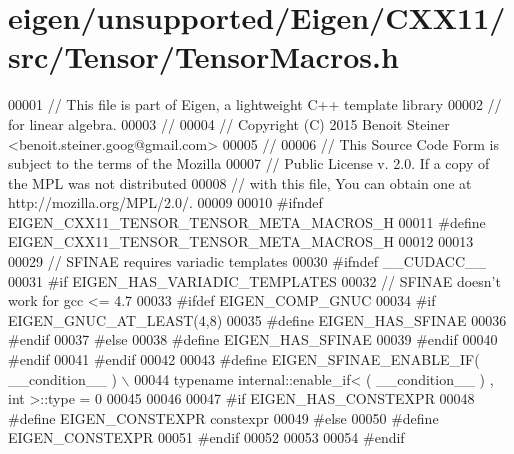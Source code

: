 \hypertarget{eigen_2unsupported_2_eigen_2_c_x_x11_2src_2_tensor_2_tensor_macros_8h_source}{}\section{eigen/unsupported/\+Eigen/\+C\+X\+X11/src/\+Tensor/\+Tensor\+Macros.h}
\label{eigen_2unsupported_2_eigen_2_c_x_x11_2src_2_tensor_2_tensor_macros_8h_source}

\begin{DoxyCode}
00001 \textcolor{comment}{// This file is part of Eigen, a lightweight C++ template library}
00002 \textcolor{comment}{// for linear algebra.}
00003 \textcolor{comment}{//}
00004 \textcolor{comment}{// Copyright (C) 2015 Benoit Steiner <benoit.steiner.goog@gmail.com>}
00005 \textcolor{comment}{//}
00006 \textcolor{comment}{// This Source Code Form is subject to the terms of the Mozilla}
00007 \textcolor{comment}{// Public License v. 2.0. If a copy of the MPL was not distributed}
00008 \textcolor{comment}{// with this file, You can obtain one at http://mozilla.org/MPL/2.0/.}
00009 
00010 \textcolor{preprocessor}{#ifndef EIGEN\_CXX11\_TENSOR\_TENSOR\_META\_MACROS\_H}
00011 \textcolor{preprocessor}{#define EIGEN\_CXX11\_TENSOR\_TENSOR\_META\_MACROS\_H}
00012 
00013 
00029 \textcolor{comment}{// SFINAE requires variadic templates}
00030 \textcolor{preprocessor}{#ifndef \_\_CUDACC\_\_}
00031 \textcolor{preprocessor}{#if EIGEN\_HAS\_VARIADIC\_TEMPLATES}
00032   \textcolor{comment}{// SFINAE doesn't work for gcc <= 4.7}
00033 \textcolor{preprocessor}{  #ifdef EIGEN\_COMP\_GNUC}
00034 \textcolor{preprocessor}{    #if EIGEN\_GNUC\_AT\_LEAST(4,8)}
00035 \textcolor{preprocessor}{      #define EIGEN\_HAS\_SFINAE}
00036 \textcolor{preprocessor}{    #endif}
00037 \textcolor{preprocessor}{  #else}
00038 \textcolor{preprocessor}{    #define EIGEN\_HAS\_SFINAE}
00039 \textcolor{preprocessor}{  #endif}
00040 \textcolor{preprocessor}{#endif}
00041 \textcolor{preprocessor}{#endif}
00042 
00043 \textcolor{preprocessor}{#define EIGEN\_SFINAE\_ENABLE\_IF( \_\_condition\_\_ ) \(\backslash\)}
00044 \textcolor{preprocessor}{    typename internal::enable\_if< ( \_\_condition\_\_ ) , int >::type = 0}
00045 
00046 
00047 \textcolor{preprocessor}{#if EIGEN\_HAS\_CONSTEXPR}
00048 \textcolor{preprocessor}{#define EIGEN\_CONSTEXPR constexpr}
00049 \textcolor{preprocessor}{#else}
00050 \textcolor{preprocessor}{#define EIGEN\_CONSTEXPR}
00051 \textcolor{preprocessor}{#endif}
00052 
00053 
00054 \textcolor{preprocessor}{#endif}
\end{DoxyCode}
